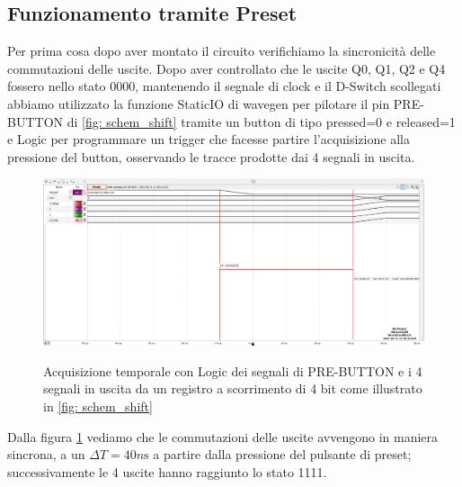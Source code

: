 \documentclass[10pt, a4paper, italian]{article}
\begin{document}
\subsection{Funzionamento tramite Preset}
Per prima cosa dopo aver montato il circuito verifichiamo la sincronicità delle commutazioni delle uscite.
Dopo aver controllato che le uscite Q0, Q1, Q2 e Q4 fossero nello stato 0000, mantenendo il segnale di clock e il D-Switch scollegati abbiamo utilizzato la funzione StaticIO di wavegen per pilotare il pin PRE-BUTTON di \cref{fig: schem_shift} tramite un button di tipo pressed=0 e released=1 e  Logic per programmare un trigger che facesse partire l'acquisizione alla pressione del button, osservando le tracce prodotte dai 4 segnali in uscita.
\begin{figure}
	\includegraphics[width=\textwidth]{3.trans}
	\label{fig: Shift_reg_trans}
	\caption{Acquisizione temporale con Logic dei segnali di PRE-BUTTON e i 4 segnali in uscita da un registro a scorrimento di 4 bit come illustrato in \cref{fig: schem_shift}}
\end{figure}
Dalla figura \cref{fig: Shift_reg_trans} vediamo che le commutazioni delle uscite avvengono in maniera sincrona, a un $\Delta T = 40 \si{n\s}$ a partire dalla pressione del pulsante di preset; successivamente le 4 uscite hanno raggiunto lo stato 1111.
\end{document}
